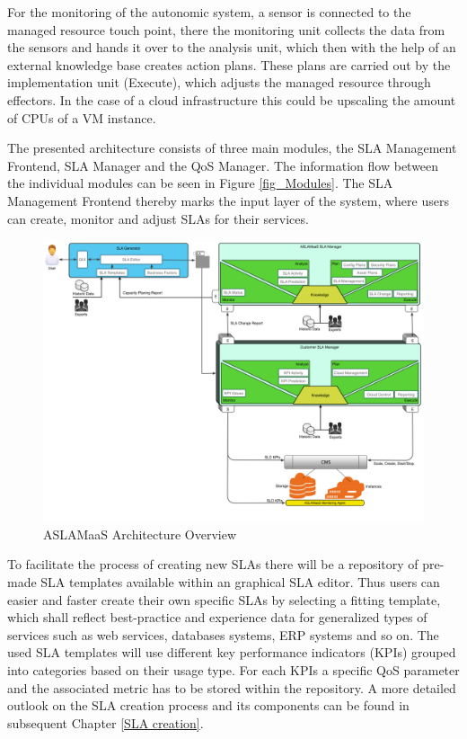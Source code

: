 For the monitoring of the autonomic system, a sensor is connected to the managed resource touch point, there the monitoring unit collects the data from the sensors and hands it over to the analysis unit, which then with the help of an external knowledge base creates action plans. These plans are carried out by the implementation unit (Execute), which adjusts the managed resource through effectors. In the case of a cloud infrastructure this could be upscaling the amount of CPUs of a VM instance.

The presented architecture consists of three main modules, the SLA Management Frontend, SLA Manager and the QoS Manager. The information flow between the individual modules can be seen in Figure \ref{fig_Modules}. The SLA Management Frontend thereby marks the input layer of the system, where users can create, monitor and adjust SLAs for their services.\\

\begin{figure}[!ht]
\centering
\includegraphics[width=5.3in]{chapters/chapter4/fig/ASLAMaaSArch.PNG}
\caption{ASLAMaaS Architecture Overview }
\label{fig_ASLAMaaSArch}
\end{figure}

To facilitate the process of creating new SLAs there will be a repository of pre-made SLA templates available within an graphical SLA editor. Thus users can easier and faster create their own specific SLAs by selecting a fitting template, which shall reflect best-practice and experience data for generalized types of services such as web services, databases systems, ERP systems and so on. The used SLA templates will use different key performance indicators (KPIs) grouped into categories based on their usage type. For each KPIs a specific QoS parameter and the associated metric has to be stored within the repository. A more detailed outlook on the SLA creation process and its components can be found in subsequent Chapter \ref{SLA creation}.


